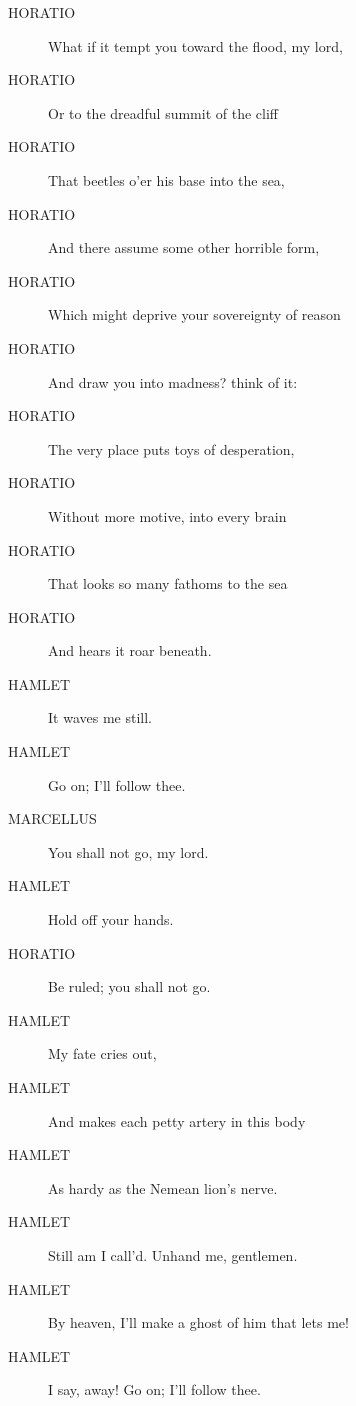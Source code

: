 \documentclass{article}
\begin{document}
\begin{description}
            
\item[HORATIO] What if it tempt you toward the flood, my lord,
\item[HORATIO] Or to the dreadful summit of the cliff
\item[HORATIO] That beetles o'er his base into the sea,
\item[HORATIO] And there assume some other horrible form,
\item[HORATIO] Which might deprive your sovereignty of reason
\item[HORATIO] And draw you into madness? think of it:
\item[HORATIO] The very place puts toys of desperation,
\item[HORATIO] Without more motive, into every brain
\item[HORATIO] That looks so many fathoms to the sea
\item[HORATIO] And hears it roar beneath.
\end{description}
          
\begin{description}
            
\item[HAMLET] It waves me still.
\item[HAMLET] Go on; I'll follow thee.
\end{description}
          
\begin{description}
            
\item[MARCELLUS] You shall not go, my lord.
\end{description}
          
\begin{description}
            
\item[HAMLET] Hold off your hands.
\end{description}
          
\begin{description}
            
\item[HORATIO] Be ruled; you shall not go.
\end{description}
          
\begin{description}
            
\item[HAMLET] My fate cries out,
\item[HAMLET] And makes each petty artery in this body
\item[HAMLET] As hardy as the Nemean lion's nerve.
\item[HAMLET] Still am I call'd. Unhand me, gentlemen.
\item[HAMLET] By heaven, I'll make a ghost of him that lets me!
\item[HAMLET] I say, away! Go on; I'll follow thee.
\end{description}
          
\end{document}

